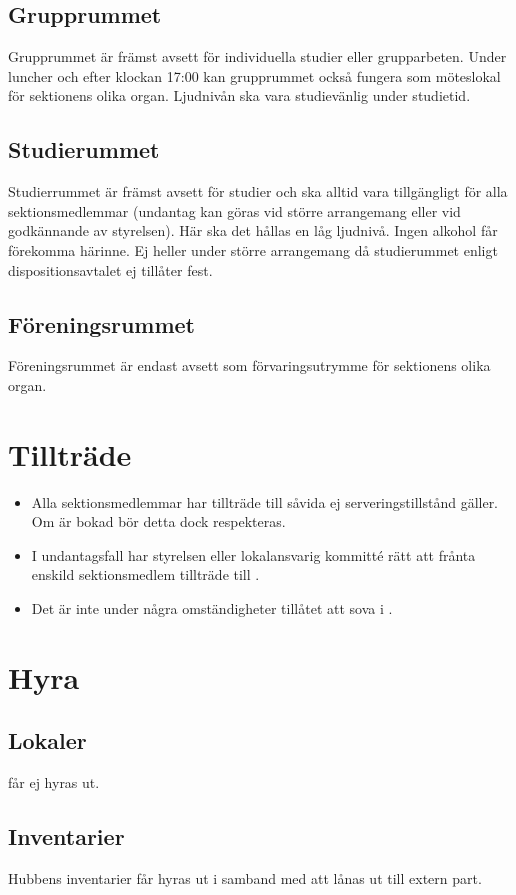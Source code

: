 \documentclass[11pt, includeaddress]{../../classes/cthit}
\begin{document}
\subsection{Grupprummet}
Grupprummet är främst avsett för individuella studier eller grupparbeten. Under luncher och efter klockan 17:00 kan grupprummet också fungera som möteslokal för sektionens olika organ. Ljudnivån ska vara studievänlig under studietid.

\subsection{Studierummet}
Studierrummet är främst avsett för studier och ska alltid vara tillgängligt för alla sektionsmedlemmar (undantag kan göras vid större arrangemang eller vid godkännande av styrelsen). Här ska det hållas en låg ljudnivå. Ingen alkohol får förekomma härinne. Ej heller under större arrangemang då studierummet enligt dispositionsavtalet ej tillåter fest.

\subsection{Föreningsrummet}
Föreningsrummet är endast avsett som förvaringsutrymme för sektionens olika organ.

\section{Tillträde}
\begin{itemize}
	\item Alla sektionsmedlemmar har tillträde till \HUBBEN{} såvida ej serveringstillstånd gäller. Om \HUBBEN{} är bokad bör detta dock respekteras.
	\item I undantagsfall har styrelsen eller lokalansvarig kommitté rätt att frånta enskild sektionsmedlem tillträde till \HUBBEN{}.
	\item Det är inte under några omständigheter tillåtet att sova i \HUBBEN{}.
\end{itemize}


\section{Hyra}
\subsection{Lokaler}
\HUBBEN{} får ej hyras ut.

\subsection{Inventarier}
Hubbens inventarier får hyras ut i samband med att \HUBBEN{} lånas ut till extern part.
\end{document}
